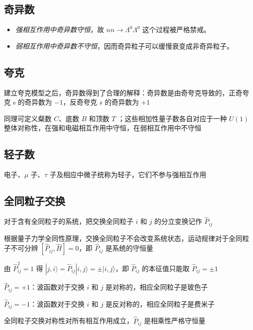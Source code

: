 \subsection{奇异数}

\begin{itemize}
    \item \emph{强相互作用中奇异数守恒}，故 $nn \to \Lambda^0 \Lambda^0$ 这个过程被严格禁戒。
    \item \emph{弱相互作用中奇异数不守恒}，因而奇异粒子可以缓慢衰变成非奇异粒子。
\end{itemize}

\subsection{夸克}

建立夸克模型之后，奇异数得到了合理的解释：奇异数是由奇夸克导致的，正奇夸克 s 的奇异数为 $-1$，反奇夸克 $\overline{s}$ 的奇异数为 $+1$

同理可定义粲数 $C$、底数 $B$ 和顶数 $T$ ；这些相加性量子数各自对应于一种 $U(1)$
整体对称性，在强和电磁相互作用中守恒，在弱相互作用中不守恒

\subsection{轻子数}

电子、$\mu$ 子、$\tau$ 子及相应中微子统称为轻子，它们不参与强相互作用

\subsection{全同粒子交换}

对于含有全同粒子的系统，把交换全同粒子 $i$ 和 $j$ 的分立变换记作 $\hat{P}_{ij}$

根据量子力学全同性原理，交换全同粒子不会改变系统状态，运动规律对于全同粒子不可分辨 $[\hat{P}_{ij}, \hat{H}] = 0$，即 $\hat{P}_{ij}$ 是系统的守恒量

由 $\hat{P}_{ij}^2 = 1$ 得 $|j, i\rangle = \hat{P}_{ij} |i, j \rangle = \pm |i, j \rangle$，即 $\hat{P}_{ij}$ 的本征值只能取 $\hat{P}_{ij} = \pm 1$

$\hat{P}_{ij} = +1$：波函数对于交换 $i$ 和 $j$ 是对称的，相应全同粒子是玻色子

$\hat{P}_{ij} = -1$：波函数对于交换 $i$ 和 $j$ 是反对称的，相应全同粒子是费米子

全同粒子交换对称性对所有相互作用成立，$\hat{P}_{ij}$ 是相乘性严格守恒量

